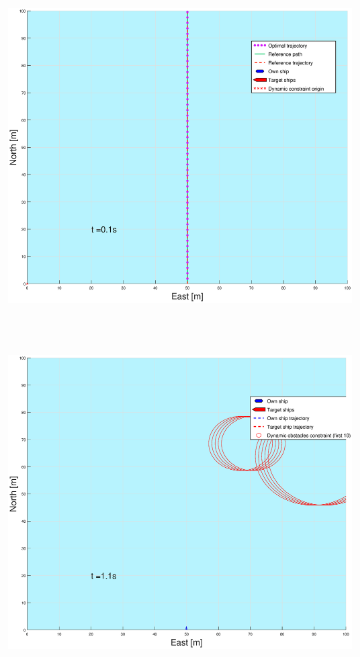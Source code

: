 \begin{figure}[!b]
\begin{subfigure}[b]{0.499\textwidth}
        \includegraphics[width=\textwidth]{Images/Figures/enkel_GW/_Simple_0fig999_time=0}
    \end{subfigure}
    \hfill
    \\
    \begin{subfigure}[b]{0.49\textwidth}
        \centering
        \includegraphics[width=\textwidth]{Images/Figures/enkel_GW/_Simple_0fig1_time=1}
    \end{subfigure}

\end{figure}
